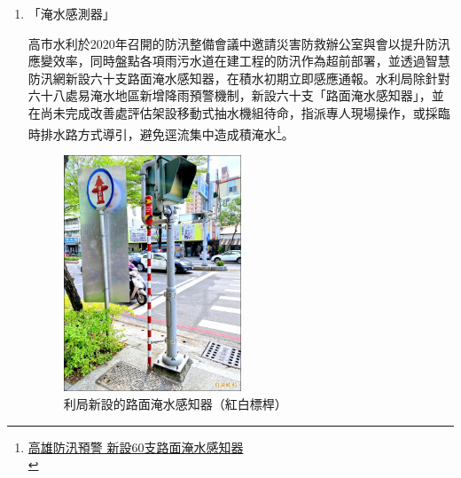 \documentclass[a4paper,12pt]{article}
\begin{document}
\begin{enumerate}
\begin{enumerate}
\item 「淹水感測器」
\label{sec:orgac9999b}

高市水利於2020年召開的防汛整備會議中邀請災害防救辦公室與會以提升防汛應變效率，同時盤點各項雨污水道在建工程的防汛作為超前部署，並透過智慧防汛網新設六十支路面淹水感知器，在積水初期立即感應通報。水利局除針對六十八處易淹水地區新增降雨預警機制，新設六十支「路面淹水感知器」，並在尚未完成改善處評估架設移動式抽水機組待命，指派專人現場操作，或採臨時排水路方式導引，避免逕流集中造成積淹水\footnote{\href{https://news.ltn.com.tw/news/life/paper/1366448}{高雄防汛預警 新設60支路面淹水感知器}\\}。\\

\begin{figure}[htbp]
\centering
\includegraphics[width=200]{images/ks218.jpg}
\caption{\label{fig:FigName}利局新設的路面淹水感知器（紅白標桿）}
\end{figure}


\end{enumerate}
\end{enumerate}
\end{document}
